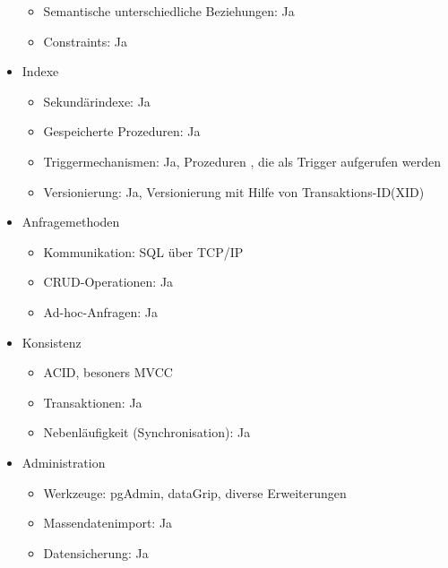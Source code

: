 \begin{itemize}
\begin{itemize}
        \item Semantische unterschiedliche Beziehungen: Ja
        \item Constraints: Ja
    \end{itemize}
    \item Indexe
    \begin{itemize}
        \item Sekundärindexe: Ja
        \item Gespeicherte Prozeduren: Ja
        \item Triggermechanismen: Ja, Prozeduren , die als Trigger aufgerufen werden %
        \item Versionierung: Ja, Versionierung mit Hilfe von Transaktions-ID(XID) %
    \end{itemize}
    \item Anfragemethoden
    \begin{itemize}
        \item Kommunikation: \ac{SQL} über \ac{TCP}/\ac{IP}
        \item \ac{CRUD}-Operationen: Ja
        \item Ad-hoc-Anfragen: Ja
    \end{itemize}
    \item Konsistenz
    \begin{itemize}
        \item \ac{ACID}, besoners \ac{MVCC}
        \item Transaktionen: Ja
        \item Nebenläufigkeit (Synchronisation): Ja
    \end{itemize}
    \item Administration
    \begin{itemize}
        \item Werkzeuge: pgAdmin, dataGrip, diverse Erweiterungen
        \item Massendatenimport: Ja
        \item Datensicherung: Ja
    \end{itemize}
\end{itemize}